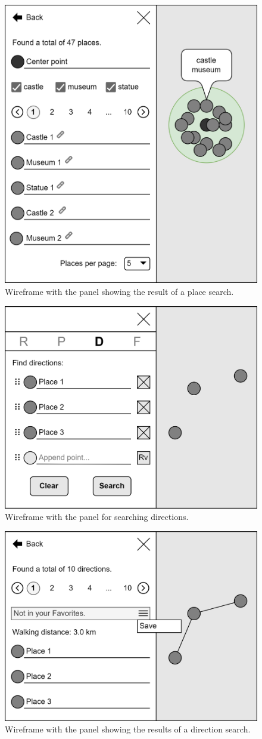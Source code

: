 \begin{figure}
\centering
\includegraphics[width=0.67\linewidth]{img/design/ui-result-places.png}
\caption{Wireframe with the panel showing the result of a place search.}
\label{fig:ui-result-places}
\end{figure}

\clearpage

\begin{figure}
\centering
\includegraphics[width=0.67\linewidth]{img/design/ui-search-direcs.png}
\caption{Wireframe with the panel for searching directions.}
\label{fig:ui-search-direcs}
\end{figure}

\begin{figure}
\centering
\includegraphics[width=0.67\linewidth]{img/design/ui-result-direcs.png}
\caption{Wireframe with the panel showing the results of a direction search.}
\label{fig:ui-result-direcs}
\end{figure}

